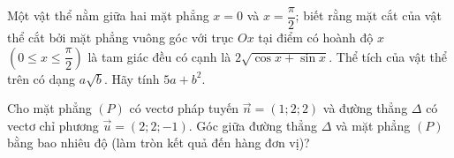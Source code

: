 \begin{ex}%
	Một vật thể nằm giữa hai mặt phẳng $x = 0$ và $x = \dfrac{\pi}{2}$; biết rằng mặt cắt của vật thể cắt bởi mặt phẳng vuông góc với trục $Ox$ tại điểm có hoành độ $x$ $\left(0 \leq x \leq \dfrac{\pi}{2}\right)$ là tam giác đều có cạnh là $2\sqrt{\cos x + \sin x}$. Thể tích của vật thể trên có dạng $a\sqrt{b}$. Hãy tính $5a + b^2$.
	\end{ex}

\begin{ex}%
Cho mặt phẳng $(P)$ có vectơ pháp tuyến $\overrightarrow{n}=(1 ; 2 ; 2)$ và đường thẳng $\Delta$ có vectơ chỉ phương $\overrightarrow{u}=(2 ; 2 ;-1)$. Góc giữa đường thẳng $\Delta$ và mặt phẳng $(P)$ bằng bao nhiêu độ (làm tròn kết quả đến hàng đơn vị)?
\end{ex}


